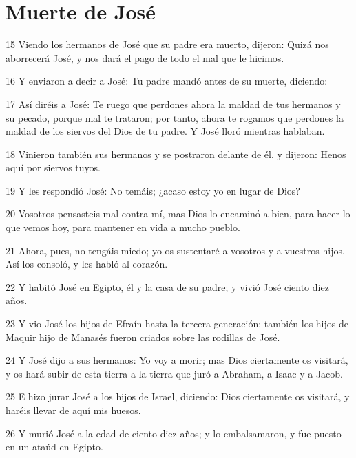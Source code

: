 \section{Muerte de José}

15 Viendo los hermanos de José que su padre era muerto, dijeron: Quizá nos aborrecerá José, y nos dará el pago de todo el mal que le hicimos.

16 Y enviaron a decir a José: Tu padre mandó antes de su muerte, diciendo:

17 Así diréis a José: Te ruego que perdones ahora la maldad de tus hermanos y su pecado, porque mal te trataron; por tanto, ahora te rogamos que perdones la maldad de los siervos del Dios de tu padre. Y José lloró mientras hablaban.

18 Vinieron también sus hermanos y se postraron delante de él, y dijeron: Henos aquí por siervos tuyos.

19 Y les respondió José: No temáis; ¿acaso estoy yo en lugar de Dios?

20 Vosotros pensasteis mal contra mí, mas Dios lo encaminó a bien, para hacer lo que vemos hoy, para mantener en vida a mucho pueblo.

21 Ahora, pues, no tengáis miedo; yo os sustentaré a vosotros y a vuestros hijos. Así los consoló, y les habló al corazón.

22 Y habitó José en Egipto, él y la casa de su padre; y vivió José ciento diez años.

23 Y vio José los hijos de Efraín hasta la tercera generación; también los hijos de Maquir hijo de Manasés fueron criados sobre las rodillas de José.

24 Y José dijo a sus hermanos: Yo voy a morir; mas Dios ciertamente os visitará, y os hará subir de esta tierra a la tierra que juró a Abraham, a Isaac y a Jacob.

25 E hizo jurar José a los hijos de Israel, diciendo: Dios ciertamente os visitará, y haréis llevar de aquí mis huesos.

26 Y murió José a la edad de ciento diez años; y lo embalsamaron, y fue puesto en un ataúd en Egipto.
